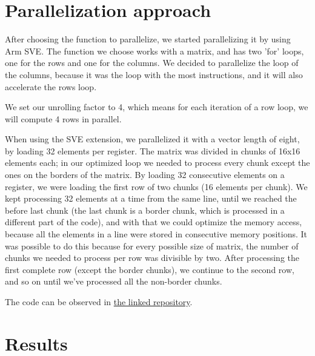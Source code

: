 \documentclass[conference]{IEEEtran}
\begin{document}
\section{Parallelization approach}


After choosing the function to parallelize, we started parallelizing it by using Arm SVE. The function we choose works with a matrix, and has two 'for' loops, one for the rows and one for the columns. We decided to parallelize the loop of the columns, because it was the loop with the most instructions, and it will also accelerate the rows loop.\par

We set our unrolling factor to 4, which means for each iteration of a row loop, we will compute 4 rows in parallel.

When using the SVE extension, we parallelized it with a vector length of eight, by loading 32 elements per register. The matrix was divided in chunks of 16x16 elements each; in our optimized loop we needed to process every chunk except the ones on the borders of the matrix. By loading 32 consecutive elements on a register, we were loading the first row of two chunks (16 elements per chunk). We kept processing 32 elements at a time from the same line, until we reached the before last chunk (the last chunk is a border chunk, which is processed in a different part of the code), and with that we could optimize the memory access, because all the elements in a line were stored in consecutive memory positions. It was possible to do this because for every possible size of matrix, the number of chunks we needed to process per row was divisible by two. After processing the first complete row (except the border chunks), we continue to the second row, and so on until we've processed all the non-border chunks.

The code can be observed in \href{https://github.com/josejsarmento/AAC_hotspot_SVE}{the linked repository}.

%



\section{Results}
\end{document}
